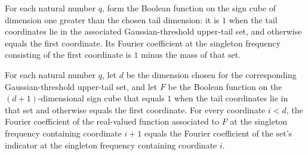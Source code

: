 \begin{theorem}
\label{FABL.fourierCoeff_fknOptimalityFunction_zero}
\leanok
{}
For each natural number $q$, form the Boolean function on the sign cube of dimension one
greater than the chosen tail dimension: it is $1$ when the tail coordinates lie in the
associated Gaussian-threshold upper-tail set, and otherwise equals the first coordinate.
Its Fourier coefficient at the singleton frequency consisting of the first coordinate is
$1$ minus the mass of that set.
\end{theorem}

\begin{theorem}
\label{FABL.fourierCoeff_fknOptimalityFunction_succ}
\leanok
{}
For each natural number $q$, let $d$ be the dimension chosen for the corresponding
Gaussian-threshold upper-tail set, and let $F$ be the Boolean function on the
$(d+1)$-dimensional sign cube that equals $1$ when the tail coordinates lie in that set
and otherwise equals the first coordinate. For every coordinate $i<d$, the Fourier
coefficient of the real-valued function associated to $F$ at the singleton frequency
containing coordinate $i+1$ equals the Fourier coefficient of the set's indicator at the
singleton frequency containing coordinate $i$.
\end{theorem}

